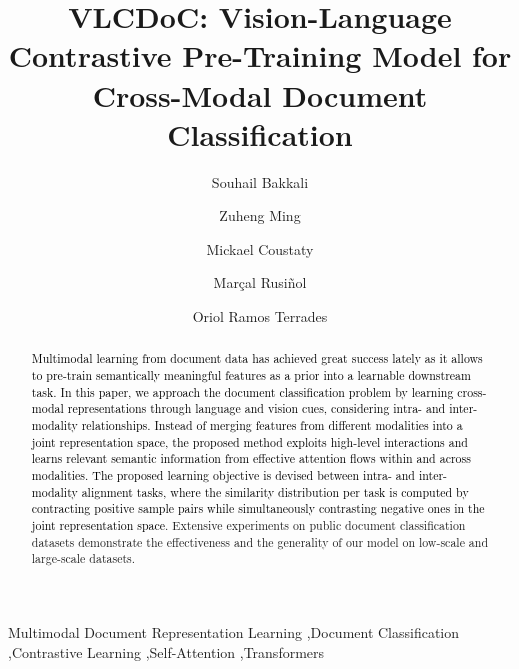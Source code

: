 \documentclass[preprint,review,12pt]{elsarticle}
\begin{document}
\begin{frontmatter}

\title{VLCDoC: Vision-Language Contrastive Pre-Training Model for Cross-Modal Document Classification}


\author[inst1]{Souhail Bakkali}
\author[inst1]{Zuheng Ming}
\author[inst1]{Mickael Coustaty}
\author[inst2,inst3]{Marçal Rusiñol}
\author[inst3]{Oriol Ramos Terrades}


\begin{abstract}

  \textcolor{black}{Multimodal learning from document data has achieved great success lately as it allows to pre-train semantically meaningful features as a prior into a learnable downstream task. In this paper, we approach the document classification problem by learning cross-modal representations through language and vision cues, considering intra- and inter-modality relationships. Instead of merging features from different modalities into a joint representation space, the proposed method exploits high-level interactions and learns relevant semantic information from effective attention flows within and across modalities. The proposed learning objective is devised between intra- and inter-modality alignment tasks, where the similarity distribution per task is computed by contracting positive sample pairs while simultaneously contrasting negative ones in the joint representation space}. Extensive experiments on public document classification datasets demonstrate the effectiveness and the generality of our model on low-scale and large-scale datasets.
\end{abstract}

\begin{keyword}

Multimodal Document Representation Learning \sep Document Classification \sep Contrastive Learning \sep Self-Attention \sep Transformers

\end{keyword}

\end{frontmatter}
\end{document}
